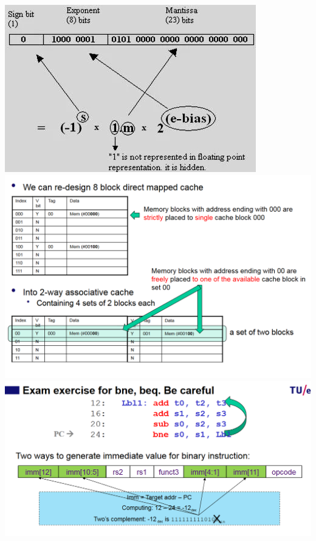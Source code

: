 \documentclass[12pt,landscape,a4paper]{article}
\begin{document}
\includegraphics[scale=0.6]{floating.jpg}
\includegraphics[scale=0.3]{direct-two-ass.PNG}
\includegraphics[scale=0.3]{offset.PNG}
\end{document}
